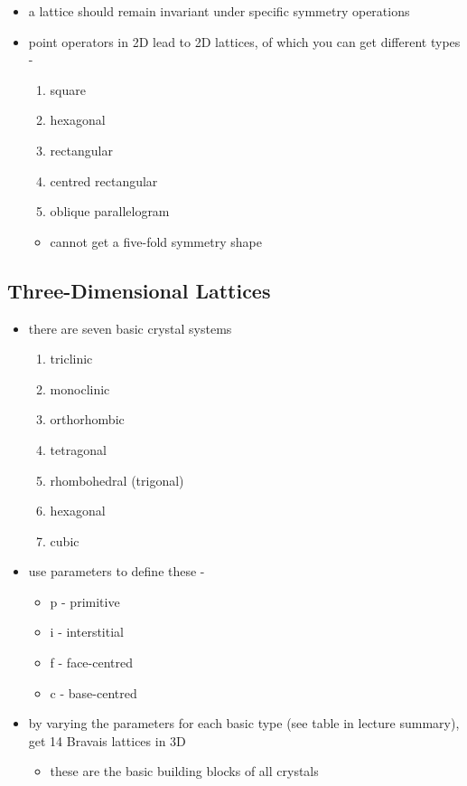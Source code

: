 \documentclass[a4paper,11pt,normalem]{article}
\begin{document}
\begin{itemize}
    \item a lattice should remain invariant under specific symmetry operations
    \item point operators in 2D lead to 2D lattices, of which you can get different types -
        \begin{enumerate}
            \item square
            \item hexagonal
            \item rectangular
            \item centred rectangular
            \item oblique parallelogram
        \end{enumerate}
        \begin{itemize}
            \item cannot get a five-fold symmetry shape
        \end{itemize}
\end{itemize}

\subsection{Three-Dimensional Lattices}

\begin{itemize}
    \item there are seven basic crystal systems
        \begin{enumerate}
            \item triclinic
            \item monoclinic
            \item orthorhombic
            \item tetragonal
            \item rhombohedral (trigonal)
            \item hexagonal
            \item cubic
        \end{enumerate}
    \item use parameters to define these -
        \begin{itemize}
            \item p - primitive
            \item i - interstitial
            \item f - face-centred
            \item c - base-centred
        \end{itemize}
    \item by varying the parameters for each basic type (see table in lecture summary), get 14 Bravais lattices in 3D
        \begin{itemize}
            \item these are the basic building blocks of all crystals
        \end{itemize}
\end{itemize}
\end{document}
